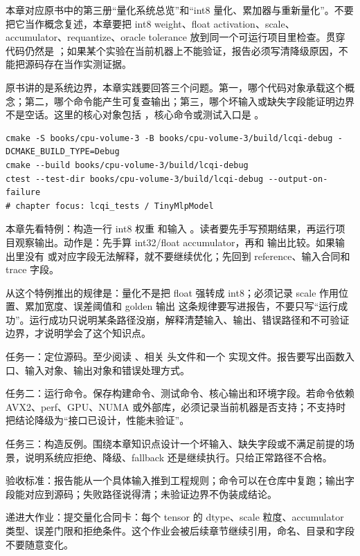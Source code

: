 
本章对应原书中的第三册“量化系统总览”和“int8 量化、累加器与重新量化”。不要把它当作概念复述，本章要把 int8 weight、float activation、scale、accumulator、requantize、oracle tolerance 放到同一个可运行项目里检查。贯穿代码仍然是 ；如果某个实验在当前机器上不能验证，报告必须写清降级原因，不能把源码存在当作实测证据。


原书讲的是系统边界，本章实践要回答三个问题。第一，哪个代码对象承载这个概念；第二，哪个命令能产生可复查输出；第三，哪个坏输入或缺失字段能证明边界不是空话。这里的核心对象包括 ，核心命令或测试入口是 。

\begin{lstlisting}[numbers=none,caption={第 4 章实践：int8 量化、累加器与重新量化 的最小命令入口}]
cmake -S books/cpu-volume-3 -B books/cpu-volume-3/build/lcqi-debug -DCMAKE_BUILD_TYPE=Debug
cmake --build books/cpu-volume-3/build/lcqi-debug
ctest --test-dir books/cpu-volume-3/build/lcqi-debug --output-on-failure
# chapter focus: lcqi_tests / TinyMlpModel
\end{lstlisting}


本章先看特例：构造一行 int8 权重 \code{[2,-1,3,0]} 和输入 \code{[1,2,-1,0.5]}。读者要先手写预期结果，再运行项目观察输出。动作是：先手算 int32/float accumulator，再和  输出比较。如果输出里没有  或对应字段无法解释，就不要继续优化；先回到 reference、输入合同和 trace 字段。

从这个特例推出的规律是：量化不是把 float 强转成 int8；必须记录 scale 作用位置、累加宽度、误差阈值和 golden 输出 这条规律要写进报告，不要只写“运行成功”。运行成功只说明某条路径没崩，解释清楚输入、输出、错误路径和不可验证边界，才说明学会了这个知识点。


任务一：定位源码。至少阅读 、相关  头文件和一个  实现文件。报告要写出函数入口、输入对象、输出对象和错误处理方式。

任务二：运行命令。保存构建命令、测试命令、核心输出和环境字段。若命令依赖 AVX2、perf、GPU、NUMA 或外部库，必须记录当前机器是否支持；不支持时把结论降级为“接口已设计，性能未验证”。

任务三：构造反例。围绕本章知识点设计一个坏输入、缺失字段或不满足前提的场景，说明系统应拒绝、降级、fallback 还是继续执行。只给正常路径不合格。


验收标准：报告能从一个具体输入推到工程规则；命令可以在仓库中复跑；输出字段能对应到源码；失败路径说得清；未验证边界不伪装成结论。

递进大作业：提交量化合同卡：每个 tensor 的 dtype、scale 粒度、accumulator 类型、误差门限和拒绝条件。这个作业会被后续章节继续引用，命名、目录和字段不要随意变化。
